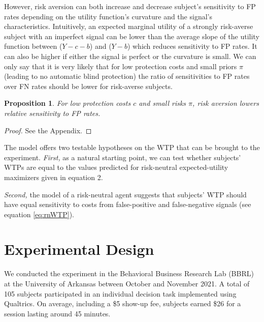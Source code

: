 \documentclass[12pt,a4paper]{article}
\newtheorem{theorem}{Proposition}
\begin{document}
However, risk aversion can both increase and decrease subject's sensitivity to FP rates depending on the utility function's curvature and the signal's characteristics. Intuitively, an expected marginal utility of a strongly risk-averse subject with an imperfect signal can be lower than the average slope of the utility function between ($Y-c-b$) and ($Y-b$) which reduces sensitivity to FP rates. It can also be higher if either the signal is perfect or the curvature is small. We can only say that it is very likely that for low protection costs and small priors $\pi$ (leading to no automatic blind protection) the ratio of sensitivities to FP rates over FN rates should be lower for risk-averse subjects. 

\begin{theorem}
For low protection costs $c$ and small risks $\pi$, risk aversion lowers relative sensitivity to FP rates. 
\end{theorem}\label{thm:riskAverse2}  

\begin{proof}
See the Appendix.
\end{proof}


\noindent The model offers two testable hypotheses on the WTP that can be brought to the experiment. \emph{First,} as a natural starting point, we can test whether subjects' WTPs are equal to the values predicted for risk-neutral expected-utility maximizers given in equation 2. 

\emph{Second,} the model of a risk-neutral agent suggests that subjects' WTP should have equal sensitivity to costs from false-positive and false-negative signals (see equation \ref{eq:rnWTP}).



\section{Experimental Design}

We conducted the experiment in the Behavioral Business Research Lab (BBRL) at the University of Arkansas between October and November 2021.  A total of 105 subjects participated in an individual decision task implemented using Qualtrics.  On average, including a \$5 show-up fee, subjects earned \$26 for a session lasting around 45 minutes. 
\end{document}
